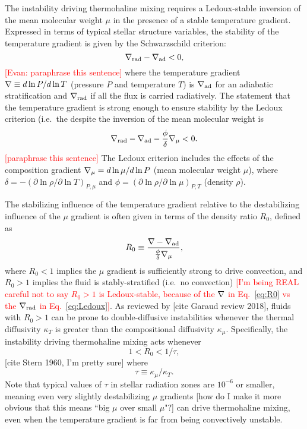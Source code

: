The instability driving thermohaline mixing requires a Ledoux-stable inversion of the mean molecular weight $\mu$ in the presence of a stable temperature gradient. 
Expressed in terms of typical stellar structure variables, the stability of the temperature gradient is given by the Schwarzschild criterion:
\begin{equation} \label{eq:Schwarzschild}
    \gradrad - \gradad < 0,
\end{equation}
\textcolor{red}{[Evan: paraphrase this sentence]} where the temperature gradient $\nabla \equiv d \ln P / d \ln T$ (pressure $P$ and temperature $T$) is $\nabla_{\rm{ad}}$ for an adiabatic stratification and $\nabla_{\rm{rad}}$ if all the flux is carried radiatively. 
The statement that the temperature gradient is strong enough to ensure stability by the Ledoux criterion (i.e.~the despite the inversion of the mean molecular weight is
\begin{equation} \label{eq:Ledoux}
    \gradrad - \gradad - \frac{\phi}{\delta}\gradmu < 0.
\end{equation}
\textcolor{red}{[paraphrase this sentence]} The Ledoux criterion includes the effects of the composition gradient $\nabla_{\mu} = d\ln\mu/d\ln P$ (mean molecular weight $\mu$), where $\delta = -(\partial \ln \rho / \partial \ln T)_{P,\mu}$ and $\phi = (\partial \ln \rho / \partial \ln\mu)_{P,T}$ (density $\rho$).

The stabilizing influence of the temperature gradient relative to the destabilizing influence of the $\mu$ gradient is often given in terms of the density ratio $R_0$, defined as
\begin{equation} \label{eq:R0}
    R_0 \equiv \frac{\grad - \gradad}{\frac{\phi}{\delta} \gradmu},
\end{equation}
where $R_0 < 1$ implies the $\mu$ gradient is sufficiently strong to drive convection, and $R_0 > 1$ implies the fluid is stably-stratified (i.e.~no convection) \textcolor{red}{[I'm being REAL careful not to say $R_0 > 1$ is Ledoux-stable, because of the $\nabla$ in Eq.~\eqref{eq:R0} vs the $\nabla_{\rm{rad}}$ in Eq.~\eqref{eq:Ledoux}]}. 
As reviewed by [cite Garaud review 2018], fluids with $R_0 > 1$ can be prone to double-diffusive instabilities whenever the thermal diffusivity $\kappa_T$ is greater than the compositional diffusivity $\kappa_\mu$. Specifically, the instability driving thermohaline mixing acts whenever
\begin{equation} \label{eq:R0_condition}
1 < R_0 < 1/\tau,
\end{equation}
[cite Stern 1960, I'm pretty sure] where
\begin{equation} \label{eq:tau}
    \tau \equiv \kappa_\mu/\kappa_T.
\end{equation}
Note that typical values of $\tau$ in stellar radiation zones are $10^{-6}$ or smaller, meaning even very slightly destabilizing $\mu$ gradients [how do I make it more obvious that this means ``big $\mu$ over small $\mu$"?] can drive thermohaline mixing, even when the temperature gradient is far from being convectively unstable.